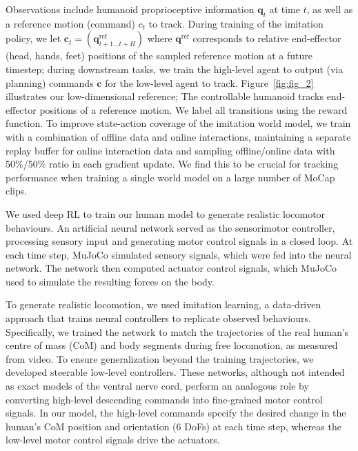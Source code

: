 \documentclass[sn-mathphys-num]{sn-jnl}%
\theoremstyle{thmstyleone}%
\theoremstyle{thmstyletwo}%
\theoremstyle{thmstylethree}%
\begin{document}
Observations include humanoid proprioceptive information $ \mathbf{q}_t $ at time $ t $, as well as a reference motion (command) $ c_t $ to track.
During training of the imitation policy, we let $ \mathbf{c}_t = (\mathbf{q}_{t+1...t+H}^\text{ref}) $ where $ \mathbf{q}^\text{ref} $ corresponds to relative end-effector (head, hands, feet) positions of the sampled reference motion at a future timestep;
during downstream tasks, we train the high-level agent to output (via planning) commands $ \mathbf{c} $ for the low-level agent to track.
Figure~\ref{fig:fig_2} illustrates our low-dimensional reference; 
The controllable humanoid tracks end-effector positions of a reference motion.
We label all transitions using the reward function.
To improve state-action coverage of the imitation world model, we train with a combination of offline data and online interactions, maintaining a separate replay buffer for online interaction data and sampling offline/online data with 50\%/50\% ratio in each gradient update.
We find this to be crucial for tracking performance when training a single world model on a large number of MoCap clips.



We used deep RL to train our human model to generate realistic locomotor behaviours.
An artificial neural network served as the sensorimotor controller, processing sensory input and generating motor control signals in a closed loop. 
At each time step, MuJoCo simulated sensory signals, which were fed into the neural network. 
The network then computed actuator control signals, which MuJoCo used to simulate the resulting forces on the body.



To generate realistic locomotion, we used imitation learning\cite{peng2018deepmimic,hasenclever2020comic}, a data-driven approach that trains neural controllers to replicate observed behaviours. 
Specifically, we trained the network to match the trajectories of the real human's centre of mass (CoM) and body segments during free locomotion, as measured from video. 
To ensure generalization beyond the training trajectories, we developed steerable low-level controllers\cite{merel2019hierarchical}. 
These networks, although not intended as exact models of the ventral nerve cord, perform an analogous role by converting high-level descending commands into fine-grained motor control signals. 
In our model, the high-level commands specify the desired change in the human's CoM position and orientation (6 DoFs) at each time step, whereas the low-level motor control signals drive the actuators.
\end{document}
